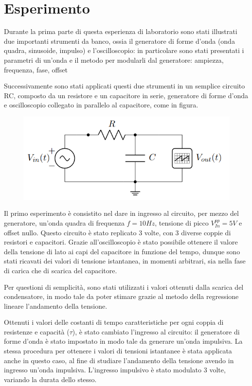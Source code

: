     \section{Esperimento}
    
    Durante la prima parte di questa esperienza di laboratorio sono stati illustrati due
    importanti strumenti da banco, ossia il generatore di forme d'onda (onda quadra, sinusoide, impulso) e l'oscilloscopio: in particolare sono stati
    presentati i parametri di un'onda e il metodo per modularli dal generatore: ampiezza, frequenza, fase, offset \par
    Successivamente sono stati applicati questi due strumenti in un semplice circuito RC, composto da
    un resistore e un capacitore in serie, generatore di forme d'onda e oscilloscopio collegato in parallelo
    al capacitore, come in figura.

    \begin{figure}[!h]
        \begin{center}
            \includegraphics[width = 6 cm]{circuito.png}
        \end{center}
    \end{figure}
        
    Il primo esperimento è consistito nel dare in ingresso al circuito, per mezzo del generatore,
    un'onda quadra di frequenza $f = 10Hz$, tensione di picco $V_{In}^{pp} = 5V$ e offset nullo.
    Questo circuito è stato replicato 3 volte, con 3 diverse coppie di resistori e capacitori.
    Grazie all'oscilloscopio è stato possibile ottenere il valore della tensione di lato ai capi 
    del capacitore in funzione del tempo, dunque sono stati ricavati dei valori di tensione istantanea,
    in momenti arbitrari, sia nella fase di carica che di scarica del capacitore.  \par
    Per questioni di semplicità, sono stati utilizzati i valori ottenuti dalla scarica del condensatore, in modo tale
    da poter stimare grazie al metodo della regressione lineare l'andamento della tensione.\par
    Ottenuti i valori delle costanti di tempo caratteristiche per ogni coppia di resistenze e capacità ($\tau$),
    è stato cambiato l'ingresso al circuito: il generatore di forme d'onda è stato impostato in modo tale da generare
    un'onda impulsiva.
    La stessa procedura per ottenere i valori di tensioni istantanee è stata applicata anche in questo caso,
    al fine di studiare l'andamento della tensione avendo in ingresso un'onda impulsiva.
    L'ingresso impulsivo è stato modulato 3 volte, variando la durata dello stesso.    

